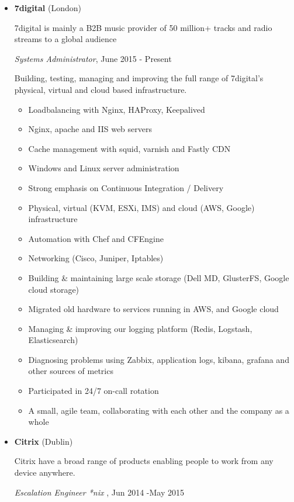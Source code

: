 \documentclass[]{article}
\providecommand{\tightlist}{%
  \setlength{\itemsep}{0pt}\setlength{\parskip}{0pt}}
\begin{document}
\begin{itemize}
\item
  \textbf{7digital} (London)

  7digital is mainly a B2B music provider of 50 million+ tracks and
  radio streams to a global audience

  \emph{Systems Administrator}, June 2015 - Present

  Building, testing, managing and improving the full range of 7digital's
  physical, virtual and cloud based infrastructure.

  \begin{itemize}
  \tightlist
  \item
    Loadbalancing with Nginx, HAProxy, Keepalived
  \item
    Nginx, apache and IIS web servers
  \item
    Cache management with squid, varnish and Fastly CDN
  \item
    Windows and Linux server administration
  \item
    Strong emphasis on Continuous Integration / Delivery
  \item
    Physical, virtual (KVM, ESXi, IMS) and cloud (AWS, Google)
    infrastructure
  \item
    Automation with Chef and CFEngine
  \item
    Networking (Cisco, Juniper, Iptables)
  \item
    Building \& maintaining large scale storage (Dell MD, GlusterFS,
    Google cloud storage)
  \item
    Migrated old hardware to services running in AWS, and Google cloud
  \item
    Managing \& improving our logging platform (Redis, Logstash,
    Elasticsearch)
  \item
    Diagnosing problems using Zabbix, application logs, kibana, grafana
    and other sources of metrics
  \item
    Participated in 24/7 on-call rotation
  \item
    A small, agile team, collaborating with each other and the company
    as a whole
  \end{itemize}
\item
  \textbf{Citrix} (Dublin)

  Citrix have a broad range of products enabling people to work from any
  device anywhere.

  \emph{Escalation Engineer *nix }, Jun 2014 -May 2015


\end{itemize}
\end{document}
